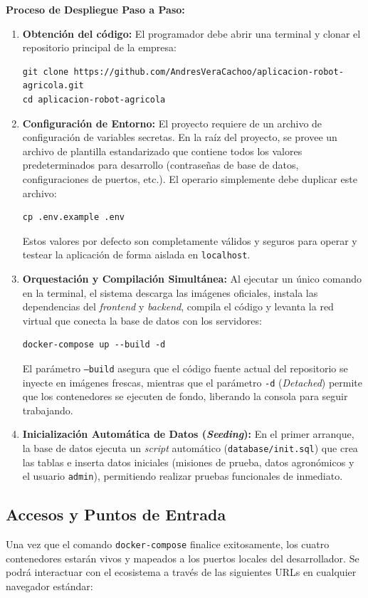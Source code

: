 \textbf{Proceso de Despliegue Paso a Paso:}
\begin{enumerate}
    \item \textbf{Obtención del código:} 
    El programador debe abrir una terminal y clonar el repositorio principal de la empresa:
    \begin{verbatim}
git clone https://github.com/AndresVeraCachoo/aplicacion-robot-agricola.git
cd aplicacion-robot-agricola
    \end{verbatim}
    
    \item \textbf{Configuración de Entorno:}
    El proyecto requiere de un archivo de configuración de variables secretas. En la raíz del proyecto, se provee un archivo de plantilla estandarizado que contiene todos los valores predeterminados para desarrollo (contraseñas de base de datos, configuraciones de puertos, etc.). El operario simplemente debe duplicar este archivo:
    \begin{verbatim}
cp .env.example .env
    \end{verbatim}
    Estos valores por defecto son completamente válidos y seguros para operar y testear la aplicación de forma aislada en \texttt{localhost}.

    \item \textbf{Orquestación y Compilación Simultánea:}
    Al ejecutar un único comando en la terminal, el sistema descarga las imágenes oficiales, instala las dependencias del \textit{frontend} y \textit{backend}, compila el código y levanta la red virtual que conecta la base de datos con los servidores:
    \begin{verbatim}
docker-compose up --build -d
    \end{verbatim}
    El parámetro \texttt{--build} asegura que el código fuente actual del repositorio se inyecte en imágenes frescas, mientras que el parámetro \texttt{-d} (\textit{Detached}) permite que los contenedores se ejecuten de fondo, liberando la consola para seguir trabajando.
    
    \item \textbf{Inicialización Automática de Datos (\textit{Seeding}):}
    En el primer arranque, la base de datos ejecuta un \textit{script} automático (\texttt{database/init.sql}) que crea las tablas e inserta datos iniciales (misiones de prueba, datos agronómicos y el usuario \texttt{admin}), permitiendo realizar pruebas funcionales de inmediato.
\end{enumerate}

\subsection{Accesos y Puntos de Entrada}
Una vez que el comando \texttt{docker-compose} finalice exitosamente, los cuatro contenedores estarán vivos y mapeados a los puertos locales del desarrollador. Se podrá interactuar con el ecosistema a través de las siguientes URLs en cualquier navegador estándar:

